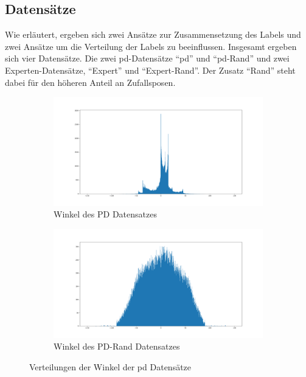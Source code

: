 \subsection{Datensätze}

Wie erläutert, ergeben sich zwei Ansätze zur Zusammensetzung des Labels und zwei Ansätze um die Verteilung der Labels zu beeinflussen. Insgesamt ergeben sich vier Datensätze. Die zwei \acs{pd}-Datensätze ``\acs{pd}'' und ``\acs{pd}-Rand'' und zwei Experten-Datensätze, ``Expert'' und ``Expert-Rand''. Der Zusatz ``Rand'' steht dabei für den höheren Anteil an Zufallsposen.\\

\begin{figure}[H]
	\centering
	\begin{subfigure}{0.5\textwidth}
		\centering
		\includegraphics[width=\linewidth]{kapitel4/images/plots/pd-angles.png}
		\caption{Winkel des PD Datensatzes}
		\label{pd-drive-angles}
	\end{subfigure}%
	\begin{subfigure}{0.5\textwidth}
		\centering
		\includegraphics[width=\linewidth]{kapitel4/images/plots/pd-rand-angles.png}
		\caption{Winkel des PD-Rand Datensatzes}
		\label{pd-rand-angles}
	\end{subfigure}
	\caption{Verteilungen der Winkel der \acs{pd} Datensätze}
	\label{pd-angles}
\end{figure}


